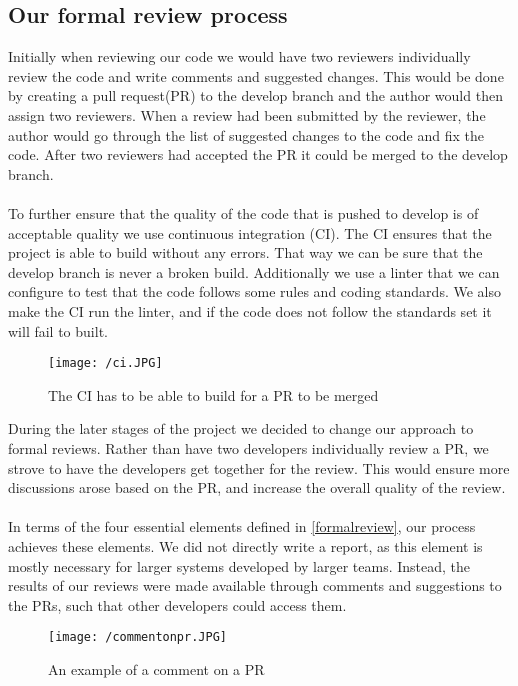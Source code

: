 \subsection{Our formal review process}
Initially when reviewing our code we would have two reviewers individually review the code and write comments and suggested changes. 
This would be done by creating a pull request(PR) to the develop branch and the author would then assign two reviewers. 
When a review had been submitted by the reviewer, the author would go through the list of suggested changes to the code and fix the code.
After two reviewers had accepted the PR it could be merged to the develop branch. 
\\\\
To further ensure that the quality of the code that is pushed to develop is of acceptable quality we use continuous integration (CI).
The CI ensures that the project is able to build without any errors. 
That way we can be sure that the develop branch is never a broken build.
Additionally we use a linter that we can configure to test that the code follows some rules and coding standards. 
We also make the CI run the linter, and if the code does not follow the standards set it will fail to built.
\begin{figure}[H]
    \texttt{[image: /ci.JPG]}
    \caption{The CI has to be able to build for a PR to be merged}
    \label{fig:continous-integration}
\end{figure}
\noindent
During the later stages of the project we decided to change our approach to formal reviews.
Rather than have two developers individually review a PR, we strove to have the developers get together for the review.
This would ensure more discussions arose based on the PR, and increase the overall quality of the review.
\\\\
In terms of the four essential elements defined in \autoref{formalreview}, our process achieves these elements.
We did not directly write a report, as this element is mostly necessary for larger systems developed by larger teams.
Instead, the results of our reviews were made available through comments and suggestions to the PRs, such that other developers could access them.
\begin{figure}[H]
    \texttt{[image: /commentonpr.JPG]}
    \caption{An example of a comment on a PR}
    \label{fig:comment-on-pr}
\end{figure}
